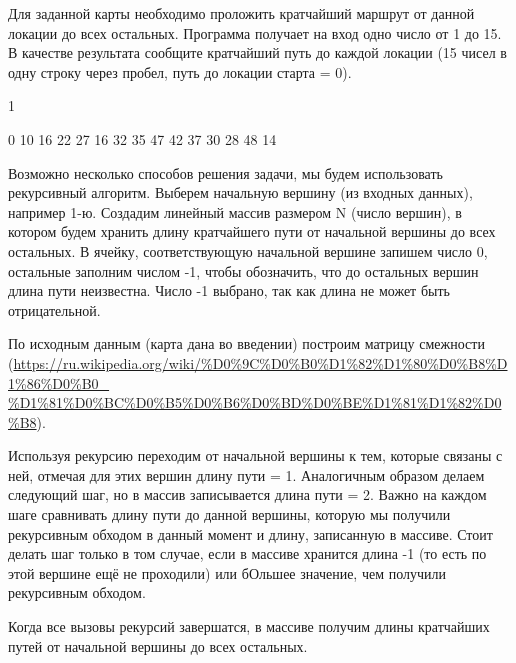 Для заданной карты необходимо проложить кратчайший маршрут от данной локации до всех остальных. Программа получает на вход одно число от 1 до 15. В качестве результата сообщите кратчайший путь до каждой локации (15 чисел в одну строку через пробел, путь до локации старта = 0).

\begin{myverbbox}[\small]{\vinput}
    1
\end{myverbbox}
\begin{myverbbox}[\small]{\voutput}
    0 10 16 22 27 16 32 35 47 42 37 30 28 48 14
\end{myverbbox}

\explanationSection

Возможно несколько способов решения задачи, мы будем использовать рекурсивный алгоритм. Выберем начальную вершину (из входных данных), например 1-ю. Создадим линейный массив размером N (число вершин), в котором будем хранить длину кратчайшего пути от начальной вершины до всех остальных. В ячейку, соответствующую начальной вершине запишем число 0, остальные заполним числом -1, чтобы обозначить, что до остальных вершин длина пути неизвестна. Число -1 выбрано, так как длина не может быть отрицательной. 

По исходным данным (карта дана во введении) построим матрицу смежности (\url{https://ru.wikipedia.org/wiki/%D0%9C%D0%B0%D1%82%D1%80%D0%B8%D1%86%D0%B0_} \linebreak \url{%D1%81%D0%BC%D0%B5%D0%B6%D0%BD%D0%BE%D1%81%D1%82%D0%B8}).

Используя рекурсию переходим от начальной вершины к тем, которые связаны с ней, отмечая для этих вершин длину пути = 1. Аналогичным образом делаем следующий шаг, но в массив записывается длина пути = 2. Важно на каждом шаге сравнивать длину пути до данной вершины, которую мы получили рекурсивным обходом в данный момент и длину, записанную в массиве. Стоит делать шаг только в том случае, если в массиве хранится длина -1 (то есть по этой вершине ещё не проходили) или бОльшее значение, чем получили рекурсивным обходом.

Когда все вызовы рекурсий завершатся, в массиве получим длины кратчайших путей от начальной вершины до всех остальных.